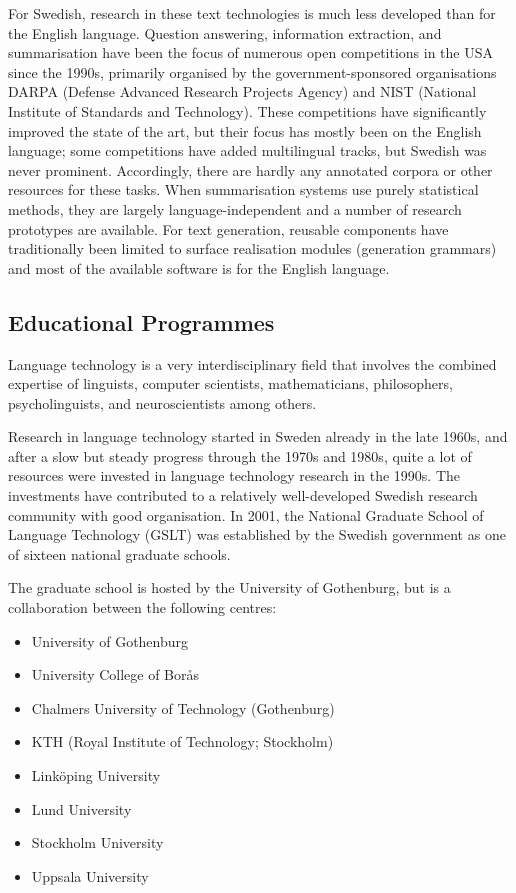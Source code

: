 \begin{multicols}{2}
For Swedish, research in these text technologies is much less developed than for the English language. Question answering, information extraction, and summarisation have been the focus of numerous open competitions in the USA since the 1990s, primarily organised by the government-sponsored organisations DARPA (Defense Advanced Research Projects Agency) and NIST (National Institute of Standards and Technology). These competitions have significantly improved the state of the art, but their focus has mostly been on the English language; some competitions have added multilingual tracks, but Swedish was never prominent. Accordingly, there are hardly any annotated corpora or other resources for these tasks. When summarisation systems use purely statistical methods, they are largely language-independent and a number of research prototypes are available. For text generation, reusable components have traditionally been limited to surface realisation modules (generation grammars) and most of the available software is for the English language.

\subsection{Educational Programmes}

Language technology is a very interdisciplinary field that involves
the combined expertise of linguists, computer scientists,
mathematicians, philosophers, psycholinguists, and neuroscientists
among others. 

Research in language technology started in Sweden
already in the late 1960s, and after a slow but steady progress
through the 1970s and 1980s, quite a lot of resources were invested in
language technology research in the 1990s. The investments have
contributed to a relatively well-developed Swedish research community
with good organisation. In 2001, the National Graduate School of
Language Technology (GSLT) was established by the Swedish government
as one of sixteen national graduate schools. 

The graduate school is
hosted by the University of Gothenburg, but is a collaboration between
the following centres:

\begin{itemize}
\item University of Gothenburg
\item University College of Borås
\item Chalmers University of Technology (Gothenburg)
\item KTH (Royal Institute of Technology; Stockholm)
\item Linköping University
\item Lund University
\item Stockholm University
\item Uppsala University
\end{itemize}


\end{multicols}
